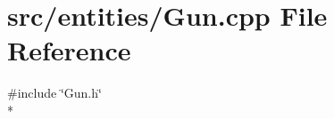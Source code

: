 \section{src/entities/\-Gun.cpp File Reference}
\label{_gun_8cpp}
{\ttfamily \#include \char`\"{}Gun.\-h\char`\"{}}\\*
